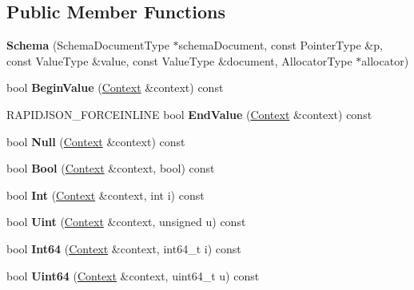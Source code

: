 \subsection*{Public Member Functions}
\begin{DoxyCompactItemize}
\item 
{\bfseries Schema} (Schema\+Document\+Type $\ast$schema\+Document, const Pointer\+Type \&p, const Value\+Type \&value, const Value\+Type \&document, Allocator\+Type $\ast$allocator)\hypertarget{a00261_a31cbb5eaff43df83253f57d51585dc1d}{}\label{a00261_a31cbb5eaff43df83253f57d51585dc1d}

\item 
bool {\bfseries Begin\+Value} (\hyperlink{a00263}{Context} \&context) const \hypertarget{a00261_a60be92e1be5daec58dca25732617ad1b}{}\label{a00261_a60be92e1be5daec58dca25732617ad1b}

\item 
R\+A\+P\+I\+D\+J\+S\+O\+N\+\_\+\+F\+O\+R\+C\+E\+I\+N\+L\+I\+NE bool {\bfseries End\+Value} (\hyperlink{a00263}{Context} \&context) const \hypertarget{a00261_a5ea07987ee41ba93eeeb6ff8fc1ea197}{}\label{a00261_a5ea07987ee41ba93eeeb6ff8fc1ea197}

\item 
bool {\bfseries Null} (\hyperlink{a00263}{Context} \&context) const \hypertarget{a00261_acf2fd31da6d4ce46142dac016af1c047}{}\label{a00261_acf2fd31da6d4ce46142dac016af1c047}

\item 
bool {\bfseries Bool} (\hyperlink{a00263}{Context} \&context, bool) const \hypertarget{a00261_af9b64174e5248f276864ae63ec478ebd}{}\label{a00261_af9b64174e5248f276864ae63ec478ebd}

\item 
bool {\bfseries Int} (\hyperlink{a00263}{Context} \&context, int i) const \hypertarget{a00261_a39286fc0bfdfe3be57b1cd61fe162f19}{}\label{a00261_a39286fc0bfdfe3be57b1cd61fe162f19}

\item 
bool {\bfseries Uint} (\hyperlink{a00263}{Context} \&context, unsigned u) const \hypertarget{a00261_af355dc00a672448f42caee5a3b62a273}{}\label{a00261_af355dc00a672448f42caee5a3b62a273}

\item 
bool {\bfseries Int64} (\hyperlink{a00263}{Context} \&context, int64\+\_\+t i) const \hypertarget{a00261_a4aa9da1fd0cb4c19dcaaeebbc8abf1dc}{}\label{a00261_a4aa9da1fd0cb4c19dcaaeebbc8abf1dc}

\item 
bool {\bfseries Uint64} (\hyperlink{a00263}{Context} \&context, uint64\+\_\+t u) const \hypertarget{a00261_afb862d9aee4bbe2aa99e0f44ec90b9d8}{}\label{a00261_afb862d9aee4bbe2aa99e0f44ec90b9d8}


\end{DoxyCompactItemize}
